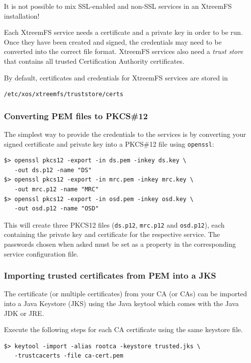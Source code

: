 \documentclass[a4paper,10pt]{book}
\begin{document}
It is not possible to mix SSL-enabled and non-SSL services in an XtreemFS installation!

Each XtreemFS service needs a certificate and a private key in order to be run. Once they have been created and signed, the credentials may need to be converted into the correct file format. XtreemFS services also need a \textit{trust store} that contains all trusted Certification Authority certificates.

By default, certificates and credentials for XtreemFS services are stored in
\begin{verbatim}
/etc/xos/xtreemfs/truststore/certs
\end{verbatim}


\subsubsection{Converting PEM files to PKCS\#12}
The simplest way to provide the credentials to the services is by converting your signed certificate and private key into a PKCS\#12 file using \texttt{openssl}:


\begin{verbatim}
$> openssl pkcs12 -export -in ds.pem -inkey ds.key \
   -out ds.p12 -name "DS"
$> openssl pkcs12 -export -in mrc.pem -inkey mrc.key \
   -out mrc.p12 -name "MRC"
$> openssl pkcs12 -export -in osd.pem -inkey osd.key \
   -out osd.p12 -name "OSD"
\end{verbatim}


This will create three PKCS12 files (\texttt{ds.p12}, \texttt{mrc.p12} and \texttt{osd.p12}), each containing the private key and certificate for the respective service. The passwords chosen when asked must be set as a property in the corresponding service configuration file.



\subsubsection{Importing trusted certificates from PEM into a JKS}

The certificate (or multiple certificates) from your CA (or CAs) can be imported into a Java Keystore (JKS)  using the Java keytool which comes with the Java JDK or JRE.

Execute the following steps for each CA certificate using the same keystore file.


\begin{verbatim}
$> keytool -import -alias rootca -keystore trusted.jks \
   -trustcacerts -file ca-cert.pem
\end{verbatim}
\end{document}
